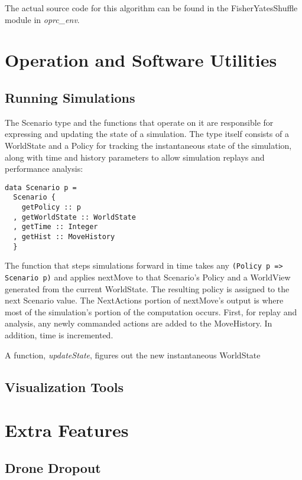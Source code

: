 The actual source code for this algorithm can be found in the FisherYatesShuffle module in \textit{oprc\_env}.

\section{Operation and Software Utilities}

\subsection{Running Simulations}

The Scenario type and the functions that operate on it are responsible for expressing and updating the state of a simulation. The type itself consists of a WorldState and a Policy for tracking the instantaneous state of the simulation, along with time and history parameters to allow simulation replays and performance analysis:

\begin{verbatim}
data Scenario p =
  Scenario {
    getPolicy :: p
  , getWorldState :: WorldState
  , getTime :: Integer
  , getHist :: MoveHistory
  }
\end{verbatim}

The function that steps simulations forward in time takes any \verb|(Policy p => Scenario p)| and applies nextMove to that Scenario's Policy and a WorldView generated from the current WorldState. The resulting policy is assigned to the next Scenario value. The NextActions portion of nextMove's output is where most of the simulation's portion of the computation occurs. First, for replay and analysis, any newly commanded actions are added to the MoveHistory. In addition, time is incremented.

A function, \textit{updateState}, figures out the new instantaneous WorldState 

\subsection{Visualization Tools}

\section{Extra Features}

\subsection{Drone Dropout}

